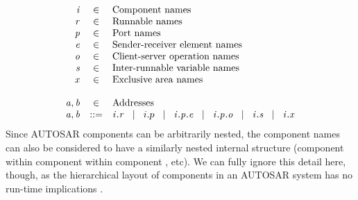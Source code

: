 \documentclass[twocolumn]{article}
\begin{document}
%
\[
\begin{array}{rcll}
  \V{I} & \in & \text{Component names} \\
  \V{R} & \in & \text{Runnable names} \\
  \V{P} & \in & \text{Port names} \\
  \V{E} & \in & \text{Sender-receiver element names} \\
  \V{O} & \in & \text{Client-server operation names} \\
  \V{S} & \in & \text{Inter-runnable variable names} \\
  \V{X} & \in & \text{Exclusive area names} \\
\\
  \V{A},\V{B} & \in & \text{Addresses} \\
  \V{A},\V{B} & ::= & \Tr{\V{R}}{\V{I}}   \sep   i.p  \sep  \Tep{\V{E}}{\V{P}}{\V{I}}   \sep \Top{\V{O}}{\V{P}}{\V{I}}   \sep   \Ts{\V{S}}{\V{I}}   \sep   \Tx{\V{X}}{\V{I}}   \\
\end{array}
\]
%
Since AUTOSAR components can be arbitrarily nested, the component names  can also be considered to have a similarly nested internal structure (component  within component  within component , etc). We can fully ignore this detail here, though, as the hierarchical layout of components in an AUTOSAR system has no run-time implications \cite{TODO2}.
\end{document}
